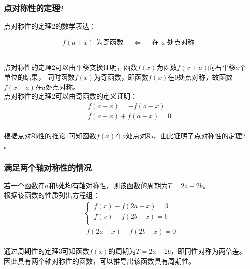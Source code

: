 \documentclass[UTF8]{ctexart}
\begin{document}
\subsubsection{点对称性的定理$2$}
    \setcounter{equation}{0}
    点对称性的定理$2$的数学表达：
    \begin{large}
        \begin{equation*}
            ~~f(a+x)\text{~为奇函数}~~~~~~\Longleftrightarrow~~~~~~\text{在~}a\text{~处点对称}
        \end{equation*}
    \end{large}\\
    点对称性的定理$2$可以由平移变换证明，函数$f(x)$为函数$f(x+a)$向右平移$a$个单位的结果，
    同时函数$f(x)$为奇函数，即函数$f(x)$在$0$处点对称，故函数$f(x+a)$在$a$处点对称。\\[3mm]
    点对称性的定理$2$可以由奇函数的定义证明：\vspace{5pt}
    \begin{align}
        &f(a+x)=-f(a-x)\\[5mm]
        &f(a+x)+f(a-x)=0
    \end{align}\\
    根据点对称性的推论$1$可知函数$f(x)$在$a$处点对称，由此证明了点对称性的定理$2$。

\newpage

\subsubsection{满足两个轴对称性的情况}
    \setcounter{equation}{0}
    若一个函数在$a$和$b$处均有轴对称性，则该函数的周期为$T=2a-2b$。\\[3mm]
    根据该函数的性质列出方程组：
    \begin{align}
        &\begin{cases}
            ~f(x)-f(2a-x)=0\\[1mm]
            ~f(x)-f(2b-x)=0\\[1mm]
        \end{cases}\\[3mm]     
        &~~f(2a-x)-f(2b-x)=0
    \end{align}\\
    通过周期性的定理$3$可知函数$f(x)$的周期为$T=2a-2b$，即同性对称为两倍差。\\[3mm]
    因此具有两个轴对称性的函数，可以推导出该函数具有周期性。\vspace{5pt}
\end{document}
